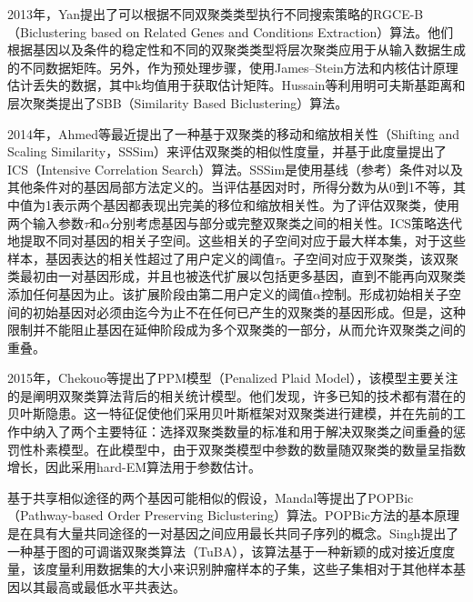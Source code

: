     2013年，Yan提出了可以根据不同双聚类类型执行不同搜索策略的RGCE-B（Biclustering based on Related Genes and Conditions Extraction）算法。他们根据基因以及条件的稳定性和不同的双聚类类型将层次聚类应用于从输入数据生成的不同数据矩阵。另外，作为预处理步骤，使用James–Stein方法和内核估计原理估计丢失的数据，其中k均值用于获取估计矩阵。Hussain等利用明可夫斯基距离和层次聚类提出了SBB（Similarity Based Biclustering）算法。

    2014年，Ahmed等最近提出了一种基于双聚类的移动和缩放相关性（Shifting and Scaling Similarity，SSSim）来评估双聚类的相似性度量，并基于此度量提出了ICS（Intensive Correlation Search）算法。SSSim是使用基线（参考）条件对以及其他条件对的基因局部方法定义的。当评估基因对时，所得分数为从0到1不等，其中值为1表示两个基因都表现出完美的移位和缩放相关性。为了评估双聚类，使用两个输入参数$\tau$和$\alpha$分别考虑基因与部分或完整双聚类之间的相关性。ICS策略迭代地提取不同对基因的相关子空间。这些相关的子空间对应于最大样本集，对于这些样本，基因表达的相关性超过了用户定义的阈值$\tau$。子空间对应于双聚类，该双聚类最初由一对基因形成，并且也被迭代扩展以包括更多基因，直到不能再向双聚类添加任何基因为止。该扩展阶段由第二用户定义的阈值$\alpha$控制。形成初始相关子空间的初始基因对必须由迄今为止不在任何已产生的双聚类的基因形成。但是，这种限制并不能阻止基因在延伸阶段成为多个双聚类的一部分，从而允许双聚类之间的重叠。

    2015年，Chekouo等提出了PPM模型（Penalized Plaid Model），该模型主要关注的是阐明双聚类算法背后的相关统计模型。他们发现，许多已知的技术都有潜在的贝叶斯隐患。这一特征促使他们采用贝叶斯框架对双聚类进行建模，并在先前的工作中纳入了两个主要特征：选择双聚类数量的标准和用于解决双聚类之间重叠的惩罚性朴素模型。在此模型中，由于双聚类模型中参数的数量随双聚类的数量呈指数增长，因此采用hard-EM算法用于参数估计。

    基于共享相似途径的两个基因可能相似的假设，Mandal等提出了POPBic（Pathway-based Order Preserving Biclustering）算法。POPBic方法的基本原理是在具有大量共同途径的一对基因之间应用最长共同子序列的概念。Singh提出了一种基于图的可调谐双聚类算法（TuBA），该算法基于一种新颖的成对接近度度量，该度量利用数据集的大小来识别肿瘤样本的子集，这些子集相对于其他样本基因以其最高或最低水平共表达。


